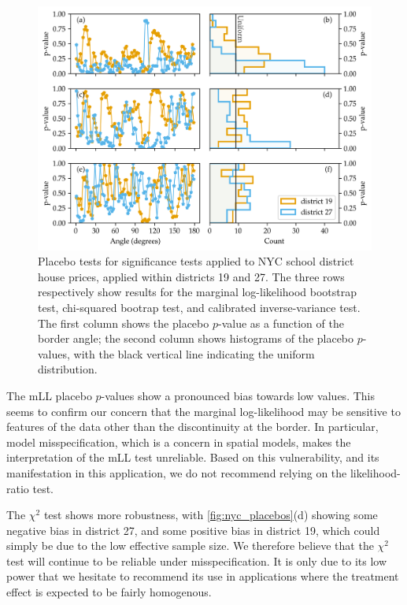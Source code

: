 \begin{figure}[tbp]
    \centering
    \includegraphics[width=\textwidth]{../NYC/NYC_plots/NYC_placebos.png}
    \caption{
		\label{fig:nyc_placebos}
		Placebo tests for significance tests applied to NYC school district house prices, applied within districts 19 and 27. The three rows respectively show results for the marginal log-likelihood bootstrap test, chi-squared bootrap test, and calibrated inverse-variance test. The first column shows the placebo \(p\)-value as a function of the border angle; the second column shows histograms of the placebo \(p\)-values, with the black vertical line indicating the uniform distribution.
	}
\end{figure}

	The mLL placebo \(p\)-values show a pronounced bias towards low values.
This seems to confirm our concern that the marginal log-likelihood may be sensitive to features of the data other than the discontinuity at the border.
In particular, model misspecification, which is a concern in spatial models, makes the interpretation of the mLL test unreliable.
Based on this vulnerability, and its manifestation in this application, we do not recommend relying on the likelihood-ratio test.

	The \(\chi^2\) test shows more robustness, with \autoref{fig:nyc_placebos}(d) showing some negative bias in district 27, and some positive bias in district 19, which could simply be due to the low effective sample size.
We therefore believe that the \(\chi^2\) test will continue to be reliable under misspecification.
It is only due to its low power that we hesitate to recommend its use in applications where the treatment effect is expected to be fairly homogenous.

